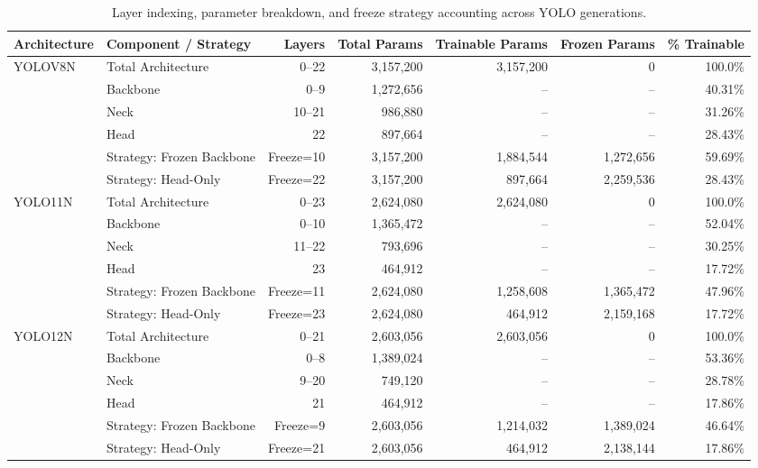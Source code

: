 \begin{table}[t]
\caption{Layer indexing, parameter breakdown, and freeze strategy accounting across YOLO generations.}
\label{tab:architecture_layer_freeze}
\centering
\begin{tabular*}{\textwidth}{@{\extracolsep{\fill}}llrrrrr@{}}
\hline
Architecture & Component / Strategy & Layers & Total Params & Trainable Params & Frozen Params & \% Trainable \\
\hline
YOLOV8N & Total Architecture & 0--22 & 3,157,200 & 3,157,200 & 0 & 100.0\% \\
 & Backbone & 0–9 & 1,272,656 & -- & -- & 40.31\% \\
 & Neck & 10–21 & 986,880 & -- & -- & 31.26\% \\
 & Head & 22 & 897,664 & -- & -- & 28.43\% \\
 & Strategy: Frozen Backbone & Freeze=10 & 3,157,200 & 1,884,544 & 1,272,656 & 59.69\% \\
 & Strategy: Head-Only & Freeze=22 & 3,157,200 & 897,664 & 2,259,536 & 28.43\% \\
\hline
YOLO11N & Total Architecture & 0--23 & 2,624,080 & 2,624,080 & 0 & 100.0\% \\
 & Backbone & 0–10 & 1,365,472 & -- & -- & 52.04\% \\
 & Neck & 11–22 & 793,696 & -- & -- & 30.25\% \\
 & Head & 23 & 464,912 & -- & -- & 17.72\% \\
 & Strategy: Frozen Backbone & Freeze=11 & 2,624,080 & 1,258,608 & 1,365,472 & 47.96\% \\
 & Strategy: Head-Only & Freeze=23 & 2,624,080 & 464,912 & 2,159,168 & 17.72\% \\
\hline
YOLO12N & Total Architecture & 0--21 & 2,603,056 & 2,603,056 & 0 & 100.0\% \\
 & Backbone & 0–8 & 1,389,024 & -- & -- & 53.36\% \\
 & Neck & 9–20 & 749,120 & -- & -- & 28.78\% \\
 & Head & 21 & 464,912 & -- & -- & 17.86\% \\
 & Strategy: Frozen Backbone & Freeze=9 & 2,603,056 & 1,214,032 & 1,389,024 & 46.64\% \\
 & Strategy: Head-Only & Freeze=21 & 2,603,056 & 464,912 & 2,138,144 & 17.86\% \\
\hline
\end{tabular*}
\end{table}